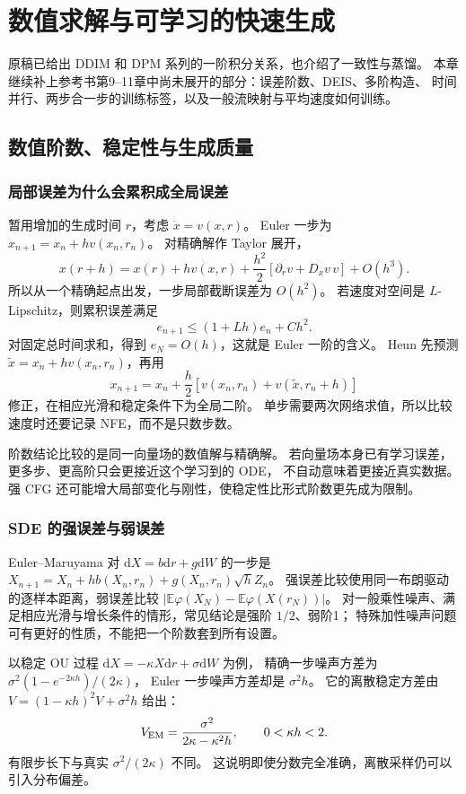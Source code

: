 \chapter{数值求解与可学习的快速生成}
\label{supp:fast}

原稿已给出 DDIM 和 DPM 系列的一阶积分关系，也介绍了一致性与蒸馏。
本章继续补上参考书第9--11章中尚未展开的部分：误差阶数、DEIS、多阶构造、
时间并行、两步合一步的训练标签，以及一般流映射与平均速度如何训练。
\cite{theorybook}

\section{数值阶数、稳定性与生成质量}
\subsection{局部误差为什么会累积成全局误差}
暂用增加的生成时间 $r$，考虑 $\dot x=v(x,r)$。
Euler 一步为 $x_{n+1}=x_n+h v(x_n,r_n)$。
对精确解作 Taylor 展开，
\[
x(r+h)=x(r)+hv(x,r)+\frac{h^2}{2}
 [\partial_rv+D_xv\,v]+O(h^3).
\]
所以从一个精确起点出发，一步局部截断误差为 $O(h^2)$。
若速度对空间是 $L$-Lipschitz，则累积误差满足
\[
e_{n+1}\leq(1+Lh)e_n+Ch^2.
\]
对固定总时间求和，得到 $e_N=O(h)$，这就是 Euler 一阶的含义。
Heun 先预测 $\tilde x=x_n+hv(x_n,r_n)$，再用
\[
x_{n+1}=x_n+\frac h2[v(x_n,r_n)+v(\tilde x,r_n+h)]
\]
修正，在相应光滑和稳定条件下为全局二阶。
单步需要两次网络求值，所以比较速度时还要记录 NFE，而不是只数步数。

阶数结论比较的是同一向量场的数值解与精确解。
若向量场本身已有学习误差，更多步、更高阶只会更接近这个学习到的 ODE，
不自动意味着更接近真实数据。强 CFG 还可能增大局部变化与刚性，使稳定性比形式阶数更先成为限制。

\subsection{SDE 的强误差与弱误差}
Euler--Maruyama 对 $\mathrm dX=b\mathrm dr+g\mathrm dW$ 的一步是
$X_{n+1}=X_n+hb(X_n,r_n)+g(X_n,r_n)\sqrt hZ_n$。
强误差比较使用同一布朗驱动的逐样本距离，弱误差比较
$|\mathbb E\varphi(X_N)-\mathbb E\varphi(X(r_N))|$。
对一般乘性噪声、满足相应光滑与增长条件的情形，常见结论是强阶 $1/2$、弱阶1；
特殊加性噪声问题可有更好的性质，不能把一个阶数套到所有设置。

以稳定 OU 过程 $\mathrm dX=-\kappa X\mathrm dr+\sigma\mathrm dW$ 为例，
精确一步噪声方差为 $\sigma^2(1-e^{-2\kappa h})/(2\kappa)$，
Euler 一步噪声方差却是 $\sigma^2h$。
它的离散稳定方差由 $V=(1-\kappa h)^2V+\sigma^2h$ 给出：
\[
V_{\rm EM}=\frac{\sigma^2}{2\kappa-\kappa^2h},\qquad 0<\kappa h<2.
\]
有限步长下与真实 $\sigma^2/(2\kappa)$ 不同。
这说明即使分数完全准确，离散采样仍可以引入分布偏差。

